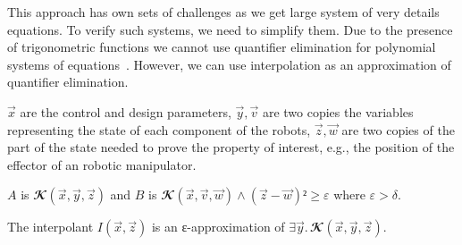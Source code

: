 This approach has own sets of challenges as we get large system of very details equations.
To verify such systems, we need to simplify them.
Due to the presence of trigonometric functions we cannot use quantifier elimination for polynomial systems of equations~\cite{qepcad}.
However, we can use interpolation as an approximation of quantifier elimination.


$\vec x$ are the control and design parameters,
$\vec y, \vec v$ are two copies the variables representing the state of each component of the robots,
$\vec z, \vec w$ are two copies of the part of the state needed to prove the property of interest, e.g., the position of the effector of an robotic manipulator.

$A$ is $𝓚(\vec x,\vec y,\vec z)$ and $B$ is $𝓚(\vec x,\vec v,\vec w) ∧ (\vec z-\vec w)² ≥ ε$ where $ε > δ$.

The interpolant $I(\vec x,\vec z)$ is an ε-approximation of $∃ \vec y.\,𝓚(\vec x,\vec y,\vec z)$.

